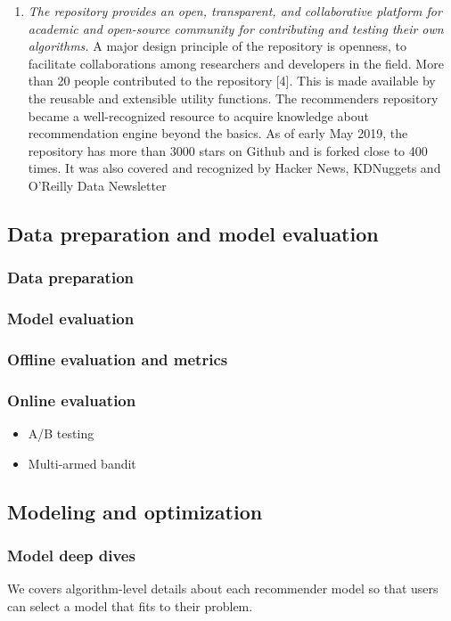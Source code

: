 \documentclass[twoside,11pt]{article}
\begin{document}
\begin{enumerate}
\item \emph{The repository provides an open, transparent, and collaborative platform for academic and open-source community for contributing and testing their own algorithms.} A major design principle of the repository is openness, to facilitate collaborations among researchers and developers in the field. More than 20 people contributed to the repository [4]. This is made available by the reusable and extensible utility functions. The recommenders repository became a well-recognized resource to acquire knowledge about recommendation engine beyond the basics. As of early May 2019, the repository has more than 3000 stars on Github and is forked close to 400 times. It was also covered and recognized by Hacker News, KDNuggets and O’Reilly Data Newsletter
\end{enumerate}


\subsection{Data preparation and model evaluation}
\subsubsection{Data preparation}
\subsubsection{Model evaluation}
\subsubsection{Offline evaluation and metrics}
\subsubsection{Online evaluation}
\begin{itemize}
  \item A/B testing
  \item Multi-armed bandit
\end{itemize}

\subsection{Modeling and optimization}
\subsubsection{Model deep dives}
We covers algorithm-level details about each recommender model so that users can select a model that fits to their problem.
\end{document}

